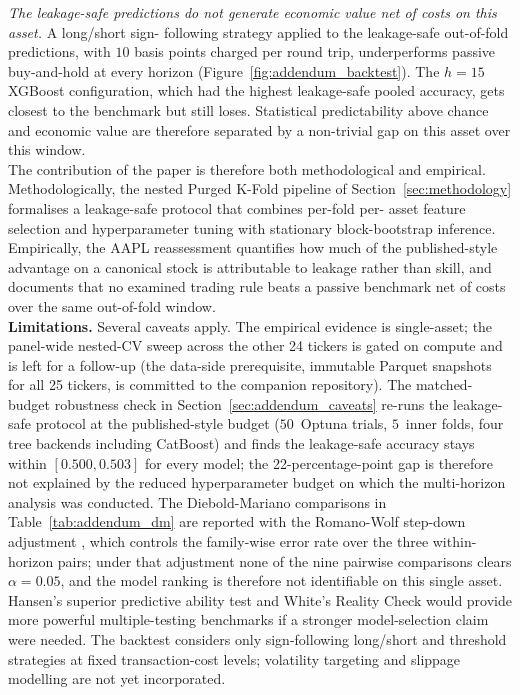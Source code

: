 \documentclass{rQUF2e}
\begin{document}
\noindent \textit{The leakage-safe predictions do not generate
economic value net of costs on this asset.} A long/short sign-
following strategy applied to the leakage-safe out-of-fold
predictions, with $10$ basis points charged per round trip,
underperforms passive buy-and-hold at every horizon
(Figure~\ref{fig:addendum_backtest}). The $h=15$ XGBoost
configuration, which had the highest leakage-safe pooled accuracy,
gets closest to the benchmark but still loses. Statistical
predictability above chance and economic value are therefore
separated by a non-trivial gap on this asset over this window. \\

\noindent The contribution of the paper is therefore both
methodological and empirical. Methodologically, the nested
Purged K-Fold pipeline of Section~\ref{sec:methodology}
formalises a leakage-safe protocol that combines per-fold per-
asset feature selection and hyperparameter tuning with stationary
block-bootstrap inference. Empirically, the AAPL reassessment
quantifies how much of the published-style advantage on a
canonical stock is attributable to leakage rather than skill, and
documents that no examined trading rule beats a passive benchmark
net of costs over the same out-of-fold window. \\

\noindent \textbf{Limitations.} Several caveats apply. The
empirical evidence is single-asset; the panel-wide nested-CV
sweep across the other 24 tickers is gated on compute and is
left for a follow-up (the data-side prerequisite, immutable
Parquet snapshots for all 25 tickers, is committed to the
companion repository). The matched-budget robustness check in
Section~\ref{sec:addendum_caveats} re-runs the leakage-safe
protocol at the published-style budget ($50$~Optuna trials,
$5$~inner folds, four tree backends including CatBoost) and
finds the leakage-safe accuracy stays within $[0.500, 0.503]$
for every model; the 22-percentage-point gap is therefore not
explained by the reduced hyperparameter budget on which the
multi-horizon analysis was conducted. The Diebold-Mariano
comparisons in Table~\ref{tab:addendum_dm} are reported with
the Romano-Wolf step-down adjustment \citep{romano2005stepwise},
which controls the family-wise error rate over the three
within-horizon pairs; under that adjustment none of the nine
pairwise comparisons clears $\alpha = 0.05$, and the model
ranking is therefore not identifiable on this single asset. Hansen's superior predictive
ability test \citep{hansen2005test} and White's Reality Check
\citep{white2000reality} would provide more powerful
multiple-testing benchmarks if a stronger model-selection claim
were needed. The backtest considers only sign-following
long/short and threshold strategies at fixed transaction-cost
levels; volatility targeting and slippage modelling are not yet
incorporated. \\
\end{document}
